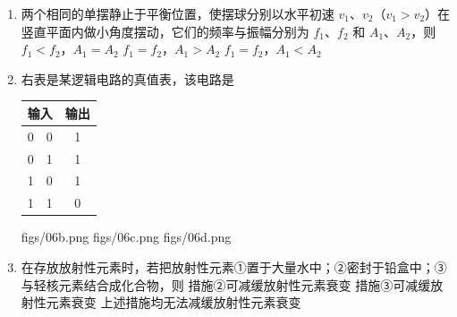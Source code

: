 \documentclass[\gkver]{gaokaozhenti}
\begin{document}
\begin{enumerate}
{
}

\item
两个相同的单摆静止于平衡位置，使摆球分别以水平初速 $v_{1}$、$v_{2}$（$v_{1} > v_{2}$）在竖直平面内做小角度摆动，它们的频率与振幅分别为 $f_{1}$、$f_{2}$ 和 $A_{1}$、$A_{2}$，则
{$f_{1} < f_{2}$，$A_{1} = A_{2}$}
{$f_{1} = f_{2}$，$A_{1} > A_{2}$}
{$f_{1} = f_{2}$，$A_{1} < A_{2}$}

\item
右表是某逻辑电路的真值表，该电路是

\begin{center}
\begin{tabular}{|c|c|c|}
\hline
\multicolumn{2}{|c|}{输入} & 输出 \\ \hline
0 & 0 & 1 \\ \hline
0 & 1 & 1 \\ \hline
1 & 0 & 1 \\ \hline
1 & 1 & 0 \\ \hline
\end{tabular}
\end{center}

{figs/06b.png}
{figs/06c.png}
{figs/06d.png}

\item
在存放放射性元素时，若把放射性元素①置于大量水中；②密封于铅盒中；③与轻核元素结合成化合物，则
{措施②可减缓放射性元素衰变}
{措施③可减缓放射性元素衰变}
{上述措施均无法减缓放射性元素衰变}


\end{enumerate}
\end{document}
